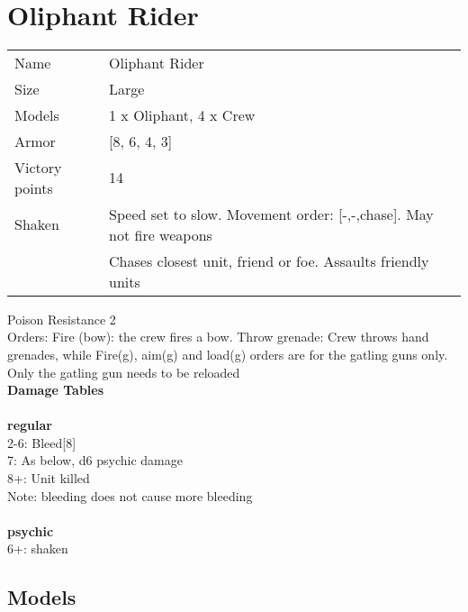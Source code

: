  
\ \\














\pagebreak\clearpage

\section{ Oliphant Rider }

\begin{tabular}{ll}
  Name & Oliphant Rider \\
  Size & Large\\
  Models & 1 x Oliphant, 4 x Crew\\
  Armor & [8, 6, 4, 3]\\
  Victory points & 14\\
  Shaken & Speed set to slow. Movement order: [-,-,chase]. May not fire weapons\\ &Chases closest unit, friend or foe. Assaults friendly units\\
\end{tabular}

Poison Resistance 2\\ 
Orders: Fire (bow): the crew fires a bow. Throw grenade: Crew throws hand grenades, while Fire(g), aim(g) and load(g) orders are for the gatling guns only. Only the gatling gun needs to be reloaded\\ 



{\bf Damage Tables} \\
\ \\ {\bf regular } \\
2-6: Bleed[8]  \\
7: As below, d6 psychic damage \\
8+: Unit killed \\
Note: bleeding does not cause more bleeding \\
\ \\ {\bf psychic } \\
6+: shaken \\


\pagebreak

\subsection{ Models }

